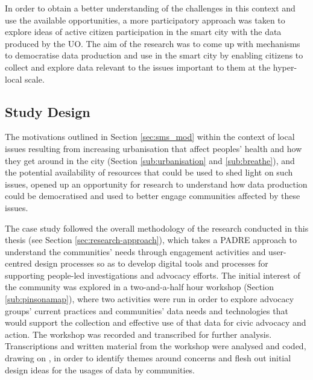 \noindent
In order to obtain a better understanding of the challenges in this context and use the available opportunities, a more participatory approach was taken to explore ideas of active citizen participation in the smart city with the data produced by the UO. The aim of the research was to come up with mechanisms to democratise data production and use in the smart city by enabling citizens to collect and explore data relevant to the issues important to them at the hyper-local scale.

\subsection{Study Design}
The motivations outlined in Section \ref{sec:sms_mod} within the context of local issues resulting from increasing urbanisation that affect peoples' health and how they get around in the city (Section \ref{sub:urbanisation} and \ref{sub:breathe}), and the potential availability of resources that could be used to shed light on such issues, opened up an opportunity for research to understand how data production could be democratised and used to better engage communities affected by these issues.

The case study followed the overall methodology of the research conducted in this thesis (see Section \ref{sec:research-approach}), which takes a PADRE approach to understand the communities' needs through engagement activities and user-centred design processes so as to develop digital tools and processes for supporting people-led investigations and advocacy efforts. The initial interest of the community was explored in a two-and-a-half hour workshop (Section \ref{sub:pinsonamap}), where two activities were run in order to explore advocacy groups' current practices and communities' data needs and technologies that would support the collection and effective use of that data for civic advocacy and action. The workshop was recorded and transcribed for further analysis. Transcriptions and written material from the workshop were analysed and coded, drawing on \citet{braun_using_2006}, in order to identify themes around concerns and flesh out initial design ideas for the usages of data by communities.

